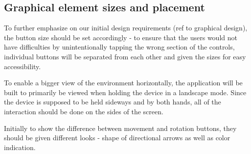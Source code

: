 \subsection{Graphical element sizes and placement}
To further emphasize on our initial design requirements (ref to graphical design), the button size should be set accordingly - to ensure that the users would not have difficulties by unintentionally tapping the wrong section of the controls, individual buttons will be separated from each other and given the sizes for easy accessibility.

To enable a bigger view of the environment horizontally, the application will be built to primarily be viewed when holding the device in a landscape mode. Since the device is supposed to be held sideways and by both hands, all of the interaction should be done on the sides of the screen.

Initially to show the difference between movement and rotation buttons, they should be given different looks - shape of directional arrows as well as color indication.

